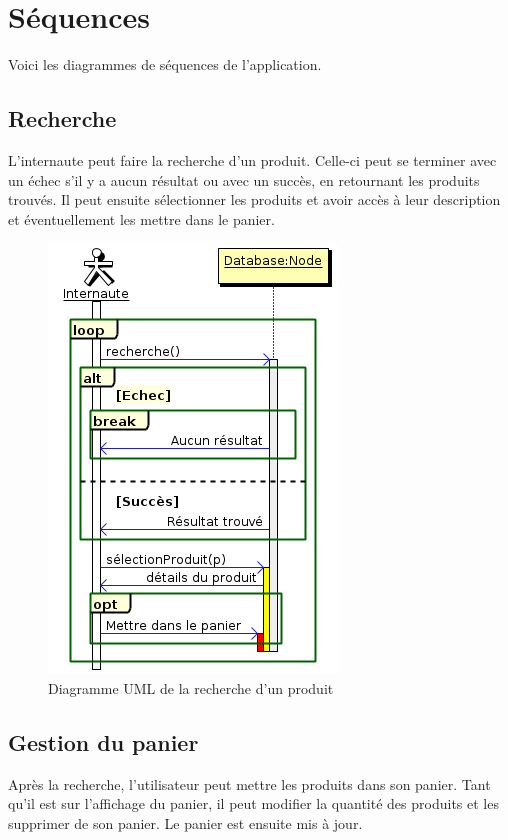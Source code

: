 \documentclass[12pt]{article}
\begin{document}
\newpage
\section{Séquences}

Voici les diagrammes de séquences de l'application.

\subsection{Recherche}

L'internaute peut faire la recherche d'un produit.
Celle-ci peut se terminer avec un échec s'il y a aucun résultat ou
avec un succès, en retournant les produits trouvés.
Il peut ensuite sélectionner les produits et avoir accès à leur description et
éventuellement les mettre dans le panier.

\begin{figure}[ht]
    \center
    \includegraphics[scale=0.7]{../Diagrams/SequenceDiagrams/recherche.png}
    \caption*{Diagramme UML de la recherche d'un produit}
\end{figure}

\newpage
\subsection{Gestion du panier}

Après la recherche, l'utilisateur peut mettre les produits dans son panier.
Tant qu'il est sur l'affichage du panier, il peut modifier la quantité des produits et les supprimer de son panier.
Le panier est ensuite mis à jour.
\end{document}
